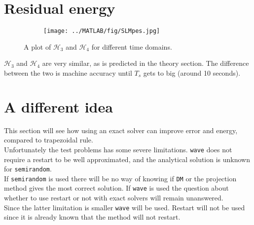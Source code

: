 \section{Residual energy}%
\label{sec:residualenergy}
\begin{figure}[H]
        \centering
        \begin{subfigure}[b]{0.45\textwidth}
                \texttt{[image: ../MATLAB/fig/SLMpes.jpg]}
        \end{subfigure}
		
        \caption{ A plot of $\mathcal{H}_3$ and $\mathcal{H}_4$ for different time domains. }
        \label{fig:SLMpes}
\end{figure}
$\mathcal{H}_3$ and $\mathcal{H}_4$ are very similar, as is predicted in the theory section. The difference between the two is machine accuracy until $T_s$ gets to big (around 10 seconds). \\
\section{A different idea} %
This section will see how using an exact solver can improve error and energy, compared to trapezoidal rule.\\
Unfortunately the test problems has some severe limitations. \texttt{wave} does not require a restart to be well approximated, and the analytical solution is unknown for \texttt{semirandom}. \\
If \texttt{semirandom} is used there will be no way of knowing if \texttt{DM} or the projection method gives the most correct solution.
If \texttt{wave} is used the question about whether to use restart or not with exact solvers will remain unanswered. \\
Since the latter limitation is smaller
\texttt{wave} will be used. Restart will not be used since it is already known that the method will not restart.

